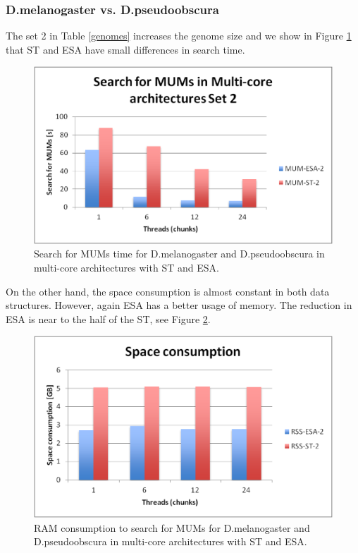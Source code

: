 \documentclass[runningheads,a4paper]{llncs}
\begin{document}
\subsubsection{D.melanogaster vs. D.pseudoobscura}
The set 2 in Table \ref{genomes} increases the genome size and we show in Figure \ref{fig:fly-mum} that ST and ESA have small differences in search time.
\begin{figure}[h]
  \centering
  \includegraphics[scale=0.3]{fly-MUM.eps}
  \caption{Search for MUMs time for D.melanogaster and D.pseudoobscura in multi-core architectures with ST and ESA.}
  \label{fig:fly-mum}
\end{figure}  
On the other hand, the space consumption is almost constant in both data structures. However, again ESA has a better usage of memory. The reduction in ESA is near to the half of the ST, see Figure \ref{fig:fly-ram}.
\begin{figure}[h]
  \centering
  \includegraphics[scale=0.3]{fly-RAM.eps}
  \caption{RAM consumption to search for MUMs for D.melanogaster and D.pseudoobscura in multi-core architectures with ST and ESA.}
  \label{fig:fly-ram}
\end{figure}  
\end{document}
